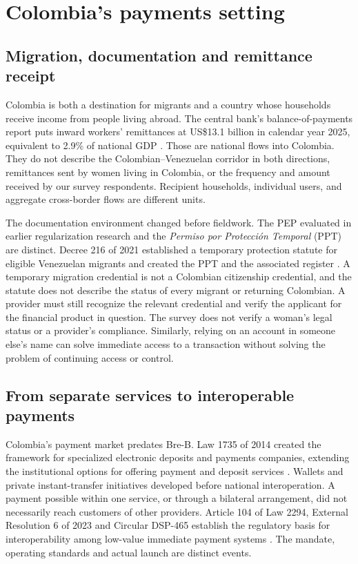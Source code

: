 \section{Colombia's payments setting}

\subsection{Migration, documentation and remittance receipt}
Colombia is both a destination for migrants and a country whose households receive income from people living abroad. The central bank's balance-of-payments report puts inward workers' remittances at US\$13.1 billion in calendar year 2025, equivalent to 2.9\% of national GDP \citep{banrepbop2026}. Those are national flows into Colombia. They do not describe the Colombian--Venezuelan corridor in both directions, remittances sent by women living in Colombia, or the frequency and amount received by our survey respondents. Recipient households, individual users, and aggregate cross-border flows are different units.

The documentation environment changed before fieldwork. The PEP evaluated in earlier regularization research and the \emph{Permiso por Protección Temporal} (PPT) are distinct. Decree 216 of 2021 established a temporary protection statute for eligible Venezuelan migrants and created the PPT and the associated register \citep{decree216}. A temporary migration credential is not a Colombian citizenship credential, and the statute does not describe the status of every migrant or returning Colombian. A provider must still recognize the relevant credential and verify the applicant for the financial product in question. The survey does not verify a woman's legal status or a provider's compliance. Similarly, relying on an account in someone else's name can solve immediate access to a transaction without solving the problem of continuing access or control.

\subsection{From separate services to interoperable payments}
Colombia's payment market predates Bre-B. Law 1735 of 2014 created the framework for specialized electronic deposits and payments companies, extending the institutional options for offering payment and deposit services \citep{law1735}. Wallets and private instant-transfer initiatives developed before national interoperation. A payment possible within one service, or through a bilateral arrangement, did not necessarily reach customers of other providers. Article 104 of Law 2294, External Resolution 6 of 2023 and Circular DSP-465 establish the regulatory basis for interoperability among low-value immediate payment systems \citep{banrepreg,banreptechnical2026}. The mandate, operating standards and actual launch are distinct events.

